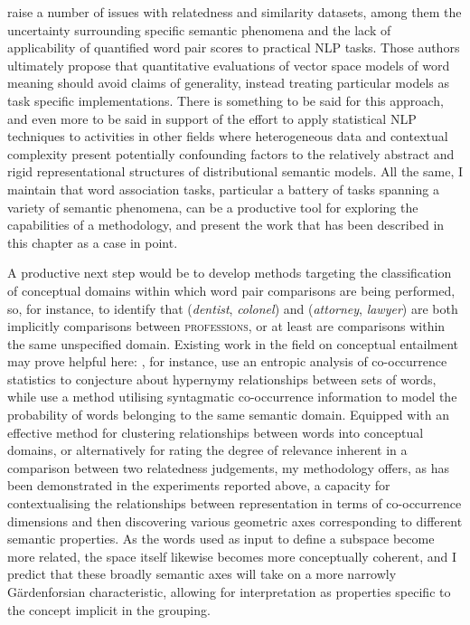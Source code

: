 \cite{FaruquiEA2016} raise a number of issues with relatedness and similarity datasets, among them the uncertainty surrounding specific semantic phenomena and the lack of applicability of quantified word pair scores to practical NLP tasks.  Those authors ultimately propose that quantitative evaluations of vector space models of word meaning should avoid claims of generality, instead treating particular models as task specific implementations.  There is something to be said for this approach, and even more to be said in support of the effort to apply statistical NLP techniques to activities in other fields where heterogeneous data and contextual complexity present potentially confounding factors to the relatively abstract and rigid representational structures of distributional semantic models.  All the same, I maintain that word association tasks, particular a battery of tasks spanning a variety of semantic phenomena, can be a productive tool for exploring the capabilities of a methodology, and present the work that has been described in this chapter as a case in point.

A productive next step would be to develop methods targeting the classification of conceptual domains within which word pair comparisons are being performed, so, for instance, to identify that (\emph{dentist}, \emph{colonel}) and (\emph{attorney}, \emph{lawyer}) are both implicitly comparisons between \textsc{professions}, or at least are comparisons within the same unspecified domain.  Existing work in the field on conceptual entailment may prove helpful here: \cite{HerbelotEA2013}, for instance, use an entropic analysis of co-occurrence statistics to conjecture about hypernymy relationships between sets of words, while \cite{MelamudEA2014} use a method utilising syntagmatic co-occurrence information to model the probability of words belonging to the same semantic domain.  Equipped with an effective method for clustering relationships between words into conceptual domains, or alternatively for rating the degree of relevance inherent in a comparison between two relatedness judgements, my methodology offers, as has been demonstrated in the experiments reported above, a capacity for contextualising the relationships between representation in terms of co-occurrence dimensions and then discovering various geometric axes corresponding to different semantic properties.  As the words used as input to define a subspace become more related, the space itself likewise becomes more conceptually coherent, and I predict that these broadly semantic axes will take on a more narrowly G\"{a}rdenforsian characteristic, allowing for interpretation as properties specific to the concept implicit in the grouping.

